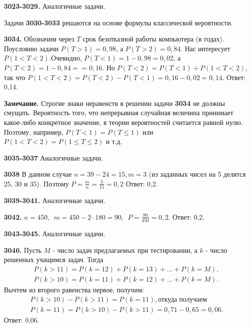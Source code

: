 \textbf{3023-3029.} Аналогичные задачи.

Задачи \textbf{3030-3033} решаются на основе формулы классической вероятности.

\textbf{3034.} Обозначим через $T$ срок безотказной работы компьютера (в годах). Поусловию задачи $P(T>1)=0,98$, а $P(T>2)=0,84.$ Нас интересует $P(1<T<2)$.\newline Очевидно, $P(T<1)=1-0,98=0,02$, а $P(T<2)=1-0,84=$\newline$=0,16$. Но $P(T<2)=P(T<1)+P(1<T<2)$, так что \newline$P(1<T<2)=P(T<2)-P(T<1)=0,16-0,02=0,14.$ \newline \null \hspace*{\fill} Ответ: 0,14. 

\textbf{Замечание.} Строгие знаки неравенств в решении задачи \textbf{3034} не должны смущать. Вероятность того, что непрерывная случайная величина принимает какое-либо конкретное значение, в теории вероятностей считается равной нулю. Поэтому, например, $P(T<1)=P(T\leq1)$ или $P(1<T<2)=P(1\leq T\leq2)$ и т.д.

\textbf{3035-3037} Аналогичные задачи.

\textbf{3038} В данном случае $n=39-24=15, m=3$ (из заданных чисел на 5 делятся 25, 30 и 35). Поэтому $P=\frac{m}{n}=\frac{3}{15}=0,2$ \newline \null \hspace*{\fill} Ответ: 0,2. 

\textbf{3039-3041.} Аналогичные задачи.

\textbf{3042.} $n=450,\enspace m=450-2\cdot180=90,\enspace P=\frac{90}{450}=0,2.$ \newline \null \hspace*{\fill} Ответ: 0,2. 

\textbf{3043-3045.} Аналогичные задачи.

\textbf{3046.} Пусть $M$ - число задач предлагаемых при тестировании, а $k$ - число решенных учащимся задач. Тогда
\begin{eqnarray*}
	P(k>11)=P(k=12)+P(k=13)+\dots+P(k=M),\\
	P(k>10)=P(k=11)+P(k=12)+\dots+P(k=M).
\end{eqnarray*}
Вычтем из второго равенства первое, получим:
\begin{eqnarray*}
	P(k>10)-P(k>11)=P(k=11), \text{откуда получаем}\\
	P(k=11)=P(k>10)-P(k>11)=0,71-0,65=0,06.
\end{eqnarray*}
\newline \null \hspace*{\fill} Ответ: 0,06. 

